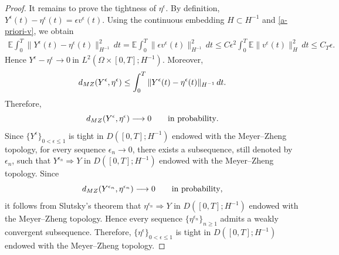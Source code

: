 \documentclass[10pt,a4paper]{amsart}
\theoremstyle{plain}
\numberwithin{equation}{section}
\begin{document}
\begin{proof}
It remains to prove the tightness of
\(\eta^\epsilon\). By definition, \(Y^\epsilon(t)-\eta^\epsilon(t)=\epsilon v^\epsilon(t).\)
Using the continuous embedding \(H\subset H^{-1}\) and \eqref{a-priori-v}, we obtain
\[
\begin{aligned}
\mathbb E\int_0^T\|Y^\epsilon(t)-\eta^\epsilon(t)\|_{H^{-1}}^2\,dt
=\mathbb E\int_0^T\|\epsilon v^\epsilon(t)\|_{H^{-1}}^2\,dt                  
\le C\epsilon^2\int_0^T\mathbb E\|v^\epsilon(t)\|_H^2\,dt                
\le C_T\epsilon .
\end{aligned}
\]
Hence \(Y^\epsilon-\eta^\epsilon \longrightarrow 0 ~ \text{in }L^2(\Omega\times[0,T];H^{-1}).\)
Moreover,
\[
d_{\rm MZ}(Y^\epsilon,\eta^\epsilon) \le \int_0^T \|Y^\epsilon(t)-\eta^\epsilon(t)\|_{H^{-1}}\,dt .
\]
Therefore,
\[
d_{\rm MZ}(Y^\epsilon,\eta^\epsilon) \longrightarrow 0 \qquad \text{in probability}.
\]
Since \(\{Y^\epsilon\}_{0<\epsilon\le1}\) is tight in \(D([0,T];H^{-1})\) endowed with the Meyer--Zheng topology, for every
sequence \(\epsilon_n\to0\), there exists a subsequence, still denoted by \(\epsilon_n\), such that \(Y^{\epsilon_n}\Longrightarrow Y\)
in \(D([0,T];H^{-1})\) endowed with the Meyer--Zheng topology. Since
\[
d_{\rm MZ}(Y^{\epsilon_n},\eta^{\epsilon_n})\longrightarrow 0\qquad \text{in probability},
\]
it follows from Slutsky's theorem that \(\eta^{\epsilon_n}\Longrightarrow Y\) in \(D([0,T];H^{-1})\) endowed with the Meyer--Zheng topology. 
Hence every sequence \(\{\eta^{\epsilon_n}\}_{n\ge1}\) admits a weakly convergent subsequence. Therefore, \(\{\eta^\epsilon\}_{0<\epsilon\le1}\) 
is tight in \(D([0,T];H^{-1})\) endowed with the Meyer--Zheng topology.
 


 
\end{proof}
\end{document}
